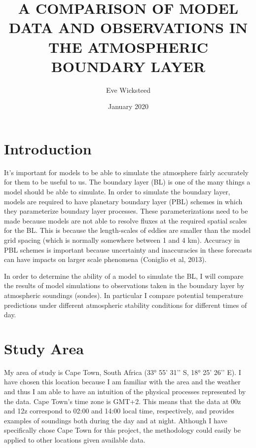\documentclass[12pt]{article}
\title{A COMPARISON OF MODEL DATA AND OBSERVATIONS IN THE ATMOSPHERIC BOUNDARY LAYER}
\author{Eve Wicksteed}
\date{January 2020}
\begin{document}
\maketitle

\section{Introduction}


It’s important for models to be able to simulate the atmosphere fairly accurately for them to 
be useful to us. The boundary layer (BL) is one of the many things a model should be able to 
simulate. In order to simulate the boundary layer, models are required to have planetary boundary 
layer (PBL) schemes in which they parameterize boundary layer processes.  These parameterizations 
need to be made because models are not able to resolve fluxes at the required spatial scales 
for the BL.  This is because the length-scales of eddies are smaller than the model grid spacing 
(which is normally somewhere between 1 and 4 km). Accuracy in PBL schemes is important because 
uncertainty and inaccuracies in these forecasts can have impacts on larger scale phenomena 
(Coniglio et al, 2013).

In order to determine the ability of a model to simulate the BL, I will compare the results of 
model simulations to observations taken in the boundary layer by atmospheric soundings (sondes). 
In particular I compare potential temperature predictions under different atmospheric stability 
conditions for different times of day. 


\section{Study Area}

My area of study is Cape Town, South Africa (33° 55’ 31’’ S, 18° 25’ 26’’ E). I have chosen 
this location because I am familiar with the area and the weather and thus I am able to have 
an intuition of the physical processes represented by the data. Cape Town’s time zone is GMT+2. 
This means that the data at 00z and 12z correspond to 02:00 and 14:00 local time, respectively, 
and provides examples of soundings both during the day and at night. Although I have specifically 
chose Cape Town for this project, the methodology could easily be applied to other locations 
given available data.

\graphicspath{ {/Users/catherinemathews/UBC/a500_notebooks/project/figures/new_to_use/} }
\end{document}

